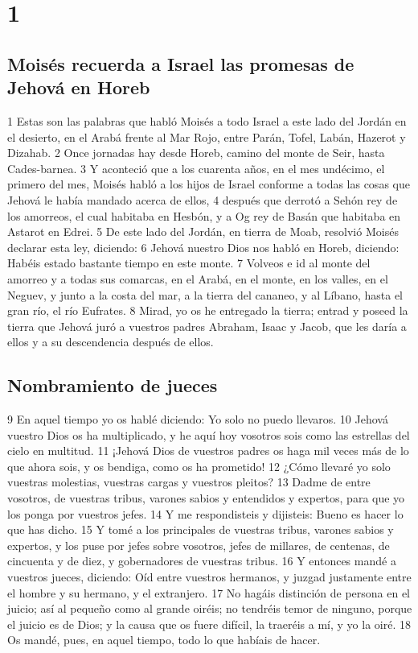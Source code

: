 
\chapter{1}

\section{Moisés recuerda a Israel las promesas de Jehová en Horeb}

1 Estas son las palabras que habló Moisés a todo Israel a este lado del Jordán en el desierto, en el Arabá frente al Mar Rojo, entre Parán, Tofel, Labán, Hazerot y Dizahab.
2 Once jornadas hay desde Horeb, camino del monte de Seir, hasta Cades-barnea.
3 Y aconteció que a los cuarenta años, en el mes undécimo, el primero del mes, Moisés habló a los hijos de Israel conforme a todas las cosas que Jehová le había mandado acerca de ellos,
4 después que derrotó a Sehón rey de los amorreos, el cual habitaba en Hesbón, y a Og rey de Basán que habitaba en Astarot en Edrei.
5 De este lado del Jordán, en tierra de Moab, resolvió Moisés declarar esta ley, diciendo:
6 Jehová nuestro Dios nos habló en Horeb, diciendo: Habéis estado bastante tiempo en este monte.
7 Volveos e id al monte del amorreo y a todas sus comarcas, en el Arabá, en el monte, en los valles, en el Neguev, y junto a la costa del mar, a la tierra del cananeo, y al Líbano, hasta el gran río, el río Eufrates.
8 Mirad, yo os he entregado la tierra; entrad y poseed la tierra que Jehová juró a vuestros padres Abraham, Isaac y Jacob, que les daría a ellos y a su descendencia después de ellos.

\section{Nombramiento de jueces }

9 En aquel tiempo yo os hablé diciendo: Yo solo no puedo llevaros.
10 Jehová vuestro Dios os ha multiplicado, y he aquí hoy vosotros sois como las estrellas del cielo en multitud.
11 ¡Jehová Dios de vuestros padres os haga mil veces más de lo que ahora sois, y os bendiga, como os ha prometido!
12 ¿Cómo llevaré yo solo vuestras molestias, vuestras cargas y vuestros pleitos?
13 Dadme de entre vosotros, de vuestras tribus, varones sabios y entendidos y expertos, para que yo los ponga por vuestros jefes.
14 Y me respondisteis y dijisteis: Bueno es hacer lo que has dicho.
15 Y tomé a los principales de vuestras tribus, varones sabios y expertos, y los puse por jefes sobre vosotros, jefes de millares, de centenas, de cincuenta y de diez, y gobernadores de vuestras tribus.
16 Y entonces mandé a vuestros jueces, diciendo: Oíd entre vuestros hermanos, y juzgad justamente entre el hombre y su hermano, y el extranjero.
17 No hagáis distinción de persona en el juicio; así al pequeño como al grande oiréis; no tendréis temor de ninguno, porque el juicio es de Dios; y la causa que os fuere difícil, la traeréis a mí, y yo la oiré.
18 Os mandé, pues, en aquel tiempo, todo lo que habíais de hacer.

